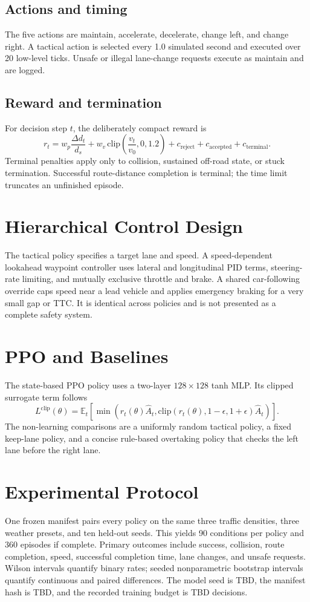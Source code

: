 \documentclass[10pt]{article}
\newcommand{\TrainingDecisions}{TBD}
\newcommand{\ModelSeed}{TBD}
\newcommand{\ManifestHash}{TBD}
\begin{document}
\subsection{Actions and timing}
The five actions are maintain, accelerate, decelerate, change left, and change
right. A tactical action is selected every 1.0 simulated second and executed
over 20 low-level ticks. Unsafe or illegal lane-change requests execute as
maintain and are logged.

\subsection{Reward and termination}
For decision step \(t\), the deliberately compact reward is
\[
 r_t =
 w_p \frac{\Delta d_t}{d_s}
 + w_v\,\mathrm{clip}\!\left(\frac{v_t}{v_0},0,1.2\right)
 + c_{\mathrm{reject}} + c_{\mathrm{accepted}} + c_{\mathrm{terminal}}.
\]
Terminal penalties apply only to collision, sustained off-road state, or
stuck termination. Successful route-distance completion is terminal; the time
limit truncates an unfinished episode.

\section{Hierarchical Control Design}
The tactical policy specifies a target lane and speed. A speed-dependent
lookahead waypoint controller uses lateral and longitudinal PID terms,
steering-rate limiting, and mutually exclusive throttle and brake. A shared
car-following override caps speed near a lead vehicle and applies emergency
braking for a very small gap or TTC. It is identical across policies and is not
presented as a complete safety system.

\section{PPO and Baselines}
The state-based PPO policy uses a two-layer \(128\times128\) tanh MLP. Its
clipped surrogate term follows
\[
 L^{\mathrm{clip}}(\theta)=
 \mathbb{E}_t\!\left[
 \min\!\left(r_t(\theta)\hat A_t,
 \mathrm{clip}(r_t(\theta),1-\epsilon,1+\epsilon)\hat A_t\right)
 \right].
\]
The non-learning comparisons are a uniformly random tactical policy, a fixed
keep-lane policy, and a concise rule-based overtaking policy that checks the
left lane before the right lane.

\section{Experimental Protocol}
One frozen manifest pairs every policy on the same three traffic densities,
three weather presets, and ten held-out seeds. This yields 90 conditions per
policy and 360 episodes if complete. Primary outcomes include success,
collision, route completion, speed, successful completion time, lane changes,
and unsafe requests. Wilson intervals quantify binary rates; seeded
nonparametric bootstrap intervals quantify continuous and paired differences.
The model seed is \ModelSeed{}, the manifest hash is \ManifestHash{}, and the
recorded training budget is \TrainingDecisions{} decisions.
\end{document}
